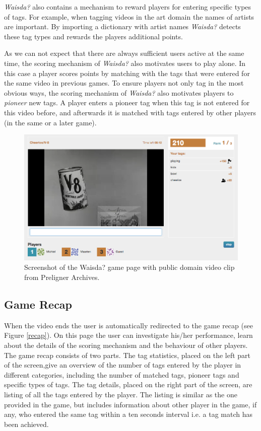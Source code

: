 \textit{Waisda?} also contains a mechanism to reward players for entering specific types of tags. For example, when tagging videos in the art domain the names of artists are important. By importing a dictionary with artist names \textit{Waisda?} detects these tag types and rewards the players additional points.

As we can not expect that there are always sufficient users active at the same time, the scoring mechanism of \textit{Waisda?} also motivates users to play alone. In this case a player scores points by matching with the tags that were entered for the same video in previous games. To ensure players not
only tag in the most obvious ways, the scoring mechanism of \textit{Waisda?} also motivates players to \textit{pioneer} new tags. A player enters a pioneer tag when this tag is not entered for this video before, and afterwards it is matched with tags entered by other players (in the same or a later game).

\begin{figure}[t!]
\centering
\includegraphics[width=\columnwidth]{figs/game} 
\caption{Screenshot of the Waisda? game page with public domain video clip from Preligner Archives.}
\label{game}
\end{figure}

\subsection{Game Recap}

When the video ends the user is automatically redirected to the game recap (see Figure \ref{recap}). On this page the user can investigate his/her performance, learn about the details of the scoring mechanism and the behaviour of other players. The game recap consists of two parts. The tag statistics, placed on the left part of the screen,give an overview of the number of tags entered by the player in different categories, including the number of matched tags, pioneer tags and specific types of tags. The tag details, placed on the right part of the screen, are listing of all the tags entered by the player. The listing is similar as the one provided in the game, but includes information about other player in the game, if any, who entered the same tag within a ten seconds interval i.e. a tag match has been achieved.

